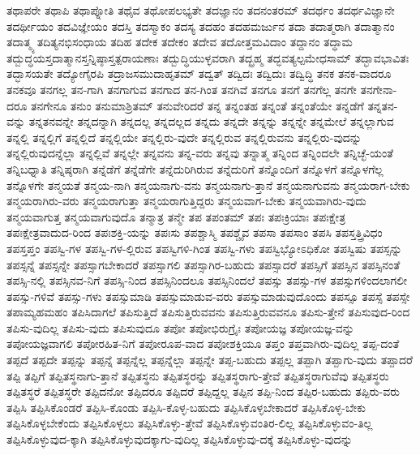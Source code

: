 {ತಥಾಪರೇ
ತಥಾಪಿ
ತಥಾಪ್ನೋತಿ
ತಥೈವ
ತಥೋಪಲಭ್ಯತೇ
ತದಜ್ಞಾನಂ
ತದನಂತರಮ್
ತದರ್ಥಂ
ತದರ್ಥವಿಜ್ಞಾನೇ
ತದರ್ಥೀಯಂ
ತದವಿಜ್ಞೇಯಂ
ತದಸ್ತಿ
ತದಸ್ಮಾಕಂ
ತದಸ್ಯ
ತದಹಂ
ತದಹಮರ್ಜುನ
ತದಾ
ತದಾತ್ಮರಾಗಿ
ತದಾತ್ಮಾನಂ
ತದಾತ್ಮ್ಯ
ತದಿತ್ಯನಭಿಸಂಧಾಯ
ತದಿಹ
ತದೇಕ
ತದೇಕಂ
ತದೇವ
ತದೋತ್ತಮವಿದಾಂ
ತದ್ದಾನಂ
ತದ್ಧಾಮ
ತದ್ಬುದ್ಧಯಸ್ತದಾತ್ಮಾನಸ್ತನ್ನಿಷ್ಠಾಸ್ತತ್ಪರಾಯಣಾಃ
ತದ್ಬುದ್ಧಿಯುಳ್ಳವರಾಗಿ
ತದ್ಬ್ರಹ್ಮ
ತದ್ಭವತ್ಯಲ್ಪಮೇಧಸಾಮ್
ತದ್ಭಾವಭಾವಿತಃ
ತದ್ಭಾಸಯತೇ
ತದ್ಯೋಗೈರಪಿ
ತದ್ರಾಜಸಮುದಾಹೃತಮ್
ತದ್ವತ್
ತದ್ವಿದಃ
ತದ್ವಿದುಃ
ತದ್ವಿದ್ಧಿ
ತನಕ
ತನಕ-ವಾದರೂ
ತನಕವೂ
ತನಗಲ್ಲ
ತನ-ಗಾಗಿ
ತನಗಾಗುವ
ತನಗಾದ
ತನ-ಗಿಂತ
ತನಗಿವೆ
ತನಗೂ
ತನಗೆ
ತನಗೆಲ್ಲ
ತನಗೇ
ತನಗೇನಾ-ದರೂ
ತನಗೇನೂ
ತನುಂ
ತನುಮಾಶ್ರಿತಮ್
ತನುವೇರಿದರೆ
ತನ್ನ
ತನ್ನಂತಹ
ತನ್ನಂತೆ
ತನ್ನಂತೆಯೇ
ತನ್ನಡೆಗೆ
ತನ್ನತನ-ವನ್ನು
ತನ್ನತನವನ್ನೇ
ತನ್ನದನ್ನಾಗಿ
ತನ್ನದಲ್ಲ
ತನ್ನದಲ್ಲದ
ತನ್ನದು
ತನ್ನದೇ
ತನ್ನನ್ನು
ತನ್ನನ್ನೇ
ತನ್ನಮೇಲೆ
ತನ್ನಲ್ಲಾಗುವ
ತನ್ನಲ್ಲಿ
ತನ್ನಲ್ಲಿಗೆ
ತನ್ನಲ್ಲಿದೆ
ತನ್ನಲ್ಲಿಯೇ
ತನ್ನಲ್ಲಿರು-ವುದೇ
ತನ್ನಲ್ಲಿರುವ
ತನ್ನಲ್ಲಿರುವನು
ತನ್ನಲ್ಲಿರು-ವುದನ್ನು
ತನ್ನಲ್ಲಿರುವುದನ್ನೆಲ್ಲಾ
ತನ್ನಲ್ಲಿವೆ
ತನ್ನಲ್ಲೇ
ತನ್ನವನು
ತನ್ನ-ವರು
ತನ್ನವು
ತನ್ನಾತ್ಮ
ತನ್ನಿಂದ
ತನ್ನಿಂದಲೇ
ತನ್ನಿಚ್ಛೆ-ಯಂತೆ
ತನ್ನಿಬಧ್ನಾತಿ
ತನ್ನಿಷ್ಠರಾಗಿ
ತನ್ನೆಡೆಗೆ
ತನ್ನೆಡೆಗೇ
ತನ್ನೆದುರಿಗಿರುವ
ತನ್ನೆದುರಿಗೆ
ತನ್ನೊಂದಿಗೆ
ತನ್ನೊಳಗೆ
ತನ್ನೊಳಗೆಲ್ಲ
ತನ್ನೊಳಗೇ
ತನ್ಮಯತೆ
ತನ್ಮಯ-ನಾಗಿ
ತನ್ಮಯನಾಗು-ವನು
ತನ್ಮಯನಾಗು-ತ್ತಾನೆ
ತನ್ಮಯನಾಗುವನು
ತನ್ಮಯರಾಗ-ಬೇಕು
ತನ್ಮಯರಾಗಿರು-ವರು
ತನ್ಮಯರಾಗುತ್ತಾ
ತನ್ಮಯರಾಗುತ್ತಿದ್ದರು
ತನ್ಮಯವಾಗ-ಬೇಕು
ತನ್ಮಯವಾಗಿರು-ವುದು
ತನ್ಮಯವಾಗುತ್ತ
ತನ್ಮಯವಾಗುವುದೊ
ತನ್ಮಾತ್ರ
ತನ್ಮೇ
ತಪ
ತಪಂತಮ್
ತಪಃ
ತಪಃಕ್ರಿಯಾಃ
ತಪಃಕ್ಷೇತ್ರ
ತಪಃಕ್ಷೇತ್ರವಾದುದ-ರಿಂದ
ತಪಃಶಕ್ತಿ-ಯನ್ನು
ತಪಃಸು
ತಪಶ್ಚಾಸ್ಮಿ
ತಪಶ್ಚೈವ
ತಪಸಾ
ತಪಸಾಂ
ತಪಸಿ
ತಪಸ್ತತ್ತ್ರಿವಿಧಂ
ತಪಸ್ತಪ್ತಂ
ತಪಸ್ವಿ-ಗಳ
ತಪಸ್ವಿ-ಗಳ-ಲ್ಲಿರುವ
ತಪಸ್ವಿಗಳಿ-ಗಿಂತ
ತಪಸ್ವಿ-ಗಳು
ತಪಸ್ವಿಭ್ಯೋಽಧಿಕೋ
ತಪಸ್ವಿಷು
ತಪಸ್ಸನ್ನು
ತಪಸ್ಸನ್ನೆ
ತಪಸ್ಸನ್ನೇ
ತಪಸ್ಸಾಗಬೇಕಾದರೆ
ತಪಸ್ಸಾಗಲಿ
ತಪಸ್ಸಾಗಿರ-ಬಹುದು
ತಪಸ್ಸಾದರೆ
ತಪಸ್ಸಿಗೆ
ತಪಸ್ಸಿನ
ತಪಸ್ಸಿನಂತೆ
ತಪಸ್ಸಿ-ನಲ್ಲಿ
ತಪಸ್ಸಿನವ-ನಿಗೆ
ತಪಸ್ಸಿ-ನಿಂದ
ತಪಸ್ಸಿನಿಂದಲೂ
ತಪಸ್ಸಿನಿಂದಲೆ
ತಪಸ್ಸು
ತಪಸ್ಸು-ಗಳ
ತಪಸ್ಸುಗಳಿಂದಲಾಗಲೀ
ತಪಸ್ಸು-ಗಳಿವೆ
ತಪಸ್ಸು-ಗಳು
ತಪಸ್ಸುಮಾಡಿ
ತಪಸ್ಸುಮಾಡುವ-ವರು
ತಪಸ್ಸುಮಾಡುವುದೊಂದು
ತಪಸ್ಸೂ
ತಪಸ್ಸೆ
ತಪಸ್ಸೇ
ತಪಾಮ್ಯಹಮಹಂ
ತಪಿಸಿದಾಗಲೆ
ತಪಿಸುತ್ತಿದೆ
ತಪಿಸುತ್ತಿರುವವನು
ತಪಿಸುತ್ತಿರುವವನೂ
ತಪಿಸು-ತ್ತೇನೆ
ತಪಿಸುವುದ-ರಿಂದ
ತಪಿಸು-ವುದಿಲ್ಲ
ತಪಿಸು-ವುದು
ತಪಿಸುವುದೂ
ತಪೋ
ತಪೋಭಿರುಗ್ರೈಃ
ತಪೋಯಜ್ಞ
ತಪೋಯಜ್ಞ-ವನ್ನು
ತಪೋಯಜ್ಞವಾಗಲಿ
ತಪೋರಹಿತ-ನಿಗೆ
ತಪೋರೂಪ-ವಾದ
ತಪೋಶಕ್ತಿಯೂ
ತಪ್ತಂ
ತಪ್ತವಾಗಿರು-ವುದಿಲ್ಲ
ತಪ್ಪ-ದಂತೆ
ತಪ್ಪದೆ
ತಪ್ಪದೇ
ತಪ್ಪನ್ನು
ತಪ್ಪನ್ನೆ
ತಪ್ಪನ್ನೆಲ್ಲ
ತಪ್ಪನ್ನೆಲ್ಲಾ
ತಪ್ಪನ್ನೇ
ತಪ್ಪ-ಬಹುದು
ತಪ್ಪಲ್ಲ
ತಪ್ಪಾಗಿ
ತಪ್ಪಾಗು-ವುದು
ತಪ್ಪಾದರೆ
ತಪ್ಪಿ
ತಪ್ಪಿಗೆ
ತಪ್ಪಿತಸ್ಥನಾಗು-ತ್ತಾನೆ
ತಪ್ಪಿತಸ್ಥನು
ತಪ್ಪಿತಸ್ಥರನ್ನು
ತಪ್ಪಿತಸ್ಥರಾಗು-ತ್ತೇವೆ
ತಪ್ಪಿತಸ್ಥರಾಗುವೆವು
ತಪ್ಪಿತಸ್ಥರು
ತಪ್ಪಿತಸ್ಥರೆ
ತಪ್ಪಿತಸ್ಥರೇ
ತಪ್ಪಿದನೋ
ತಪ್ಪಿದರೂ
ತಪ್ಪಿದರೆ
ತಪ್ಪಿದ್ದಲ್ಲ
ತಪ್ಪಿನ
ತಪ್ಪಿ-ನಿಂದ
ತಪ್ಪಿರ-ಬಹುದು
ತಪ್ಪಿರು-ವರು
ತಪ್ಪಿಸಿ
ತಪ್ಪಿಸಿಕೊಂಡರೆ
ತಪ್ಪಿಸಿ-ಕೊಂಡು
ತಪ್ಪಿಸಿ-ಕೊಳ್ಳ-ಬಹುದು
ತಪ್ಪಿಸಿಕೊಳ್ಳಬೇಕಾದರೆ
ತಪ್ಪಿಸಿಕೊಳ್ಳ-ಬೇಕು
ತಪ್ಪಿಸಿಕೊಳ್ಳಬೇಕೆಂದು
ತಪ್ಪಿಸಿಕೊಳ್ಳಲು
ತಪ್ಪಿಸಿಕೊಳ್ಳು-ತ್ತೇವೆ
ತಪ್ಪಿಸಿಕೊಳ್ಳುವಂತಿರ-ಲಿಲ್ಲ
ತಪ್ಪಿಸಿಕೊಳ್ಳುವಂ-ತಿಲ್ಲ
ತಪ್ಪಿಸಿಕೊಳ್ಳುವುದ-ಕ್ಕಾಗಿ
ತಪ್ಪಿಸಿಕೊಳ್ಳುವುದಕ್ಕಾಗು-ವುದಿಲ್ಲ
ತಪ್ಪಿಸಿಕೊಳ್ಳುವು-ದಕ್ಕೆ
ತಪ್ಪಿಸಿಕೊಳ್ಳು-ವುದನ್ನು
}
